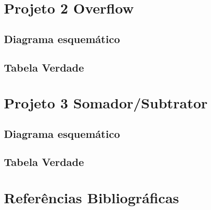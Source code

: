 \documentclass[12pts]{article}
\begin{document}
\section{Projeto 2 Overflow}

\subsection{Diagrama esquemático}

\subsection{Tabela Verdade}


\section{Projeto 3 Somador/Subtrator}

\subsection{Diagrama esquemático}

\subsection{Tabela Verdade}


\section{Referências Bibliográficas}
\end{document}
